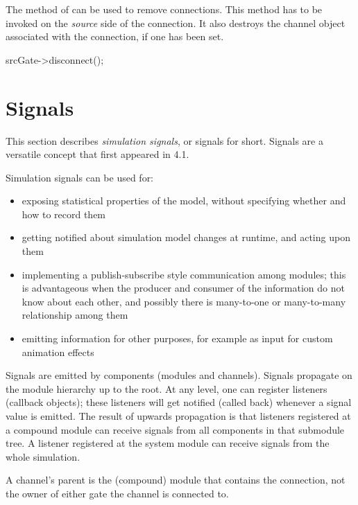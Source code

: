 The  method of  can be
used to remove connections. This method has to be invoked
on the \textit{source} side of the connection. It also destroys
the channel object associated with the connection, if one has been set.

\begin{cpp}
srcGate->disconnect();
\end{cpp}

\section{Signals}
\label{sec:simple-modules:signals}

This section describes \textit{simulation signals}, or signals for short.
Signals are a versatile concept that first appeared in {\opp} 4.1.

Simulation signals can be used for:

\begin{itemize}
  \item exposing statistical properties of the model, without specifying
        whether and how to record them
  \item getting notified about simulation model changes at runtime, and
        acting upon them
  \item implementing a publish-subscribe style communication among modules;
        this is advantageous when the producer and consumer of the information
        do not know about each other, and possibly there is many-to-one or
        many-to-many relationship among them
  \item emitting information for other purposes, for example as input for
        custom animation effects
\end{itemize}

Signals are emitted by components (modules and channels). Signals propagate
on the module hierarchy up to the root. At any level, one can register
listeners (callback objects); these listeners will get notified (called
back) whenever a signal value is emitted. The result of upwards propagation
is that listeners registered at a compound module can receive signals from
all components in that submodule tree. A listener registered at the system
module can receive signals from the whole simulation.

\begin{note}
    A channel's parent is the (compound) module that contains the connection,
    not the owner of either gate the channel is connected to.
\end{note}

